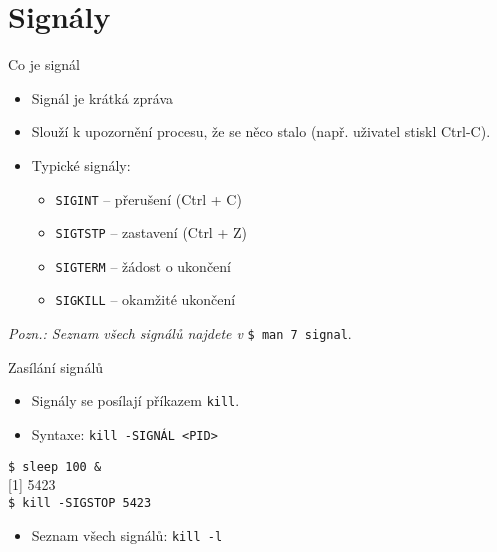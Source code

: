 \documentclass{beamer}
\begin{document}
\section{Signály}
	
\begin{frame}[fragile]{Co je signál}
	\begin{itemize}
		\item Signál je krátká zpráva
		\item Slouží k upozornění procesu, že se něco stalo (např. uživatel stiskl Ctrl-C). 
		\vspace{1em}
    		\item Typické signály: 
    \begin{itemize}
		\item \texttt{SIGINT} – přerušení (Ctrl + C)
		\item \texttt{SIGTSTP} – zastavení (Ctrl + Z)
		\item \texttt{SIGTERM} – žádost o ukončení
		\item \texttt{SIGKILL} – okamžité ukončení
	\end{itemize}
	\end{itemize}
	\vspace{3em}
	\textit{Pozn.: Seznam všech signálů najdete v} \texttt{\$ man 7 signal}.

\end{frame}

\begin{frame}[fragile]{Zasílání signálů}
	\begin{itemize}
		\item Signály se posílají příkazem \texttt{kill}.
		\item Syntaxe: \texttt{kill -SIGNÁL <PID>}
	\end{itemize}
	
	\vspace{0.5em}
	\hspace{2em}\texttt{\$ sleep 100 \&} \\
	\hspace{2em}[1] 5423 \\
	\hspace{2em}\texttt{\$ kill -SIGSTOP 5423} \\[0.5em]
	
	\begin{itemize}

		\item Seznam všech signálů: \texttt{kill -l}
	\end{itemize}
\end{frame}
	
\end{document}
